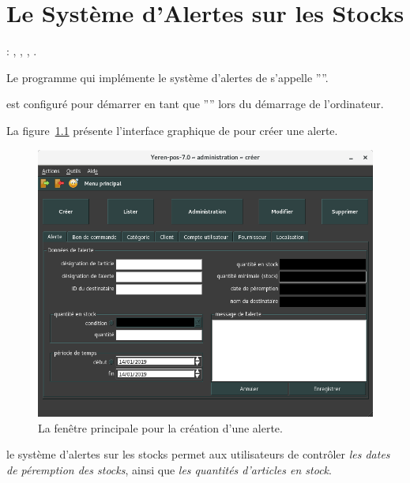 \chapter{Le Syst\`eme d'Alertes sur les Stocks}\label{chap:systeme-dalertes}

\utilisateurs: \lienadmin, \liencaissier, \lienmagasinier, \lienmanager.\\



Le programme qui impl\'emente le syst\`eme d'alertes
de \yeren s'appelle ''''.

\yerenalert est configur\'e pour d\'emarrer en tant que
'''' lors du
d\'emarrage de l'ordinateur.

La figure~\ref{fig:yeren-fenetre-creer-alerte}
pr\'esente l'interface graphique de \yeren pour
cr\'eer une alerte.

\begin{figure}[!htbp]
	\centering
	\includegraphics[scale=0.63]{images/yeren-fenetre-creer-alerte.png}
	\caption{La fen\^etre principale pour la cr\'eation d'une alerte.}
	\label{fig:yeren-fenetre-creer-alerte}
\end{figure}

le syst\`eme d'alertes sur les stocks permet aux
utilisateurs de contr\^oler \emph{les dates de
p\'eremption des stocks},
ainsi que \emph{les quantit\'es d'articles en stock}.

